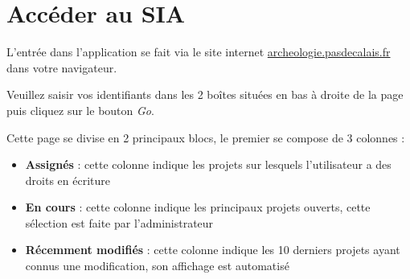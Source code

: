\documentclass[letterpaper,10pt,french]{sphinxmanual}
\begin{document}
\section{Accéder au SIA}
\label{manuel/connexion:acceder-au-sia}
L'entrée dans l'application se fait via le site internet \href{http://archeologie.pasdecalais.fr/}{archeologie.pasdecalais.fr} dans votre navigateur.
\begin{figure}[htbp]
\centering

\end{figure}

Veuillez saisir vos identifiants dans les 2 boîtes situées en bas à droite de la page puis cliquez sur le bouton \emph{Go}.

Cette page se divise en 2 principaux blocs, le premier se compose de 3 colonnes :
\begin{itemize}
\item {} 
\textbf{Assignés} : cette colonne indique les projets sur lesquels l'utilisateur a des droits en écriture

\item {} 
\textbf{En cours} : cette colonne indique les principaux projets ouverts, cette sélection est faite par l'administrateur

\item {} 
\textbf{Récemment modifiés} : cette colonne indique les 10 derniers projets ayant connus une modification, son affichage est automatisé

\end{itemize}
\end{document}

